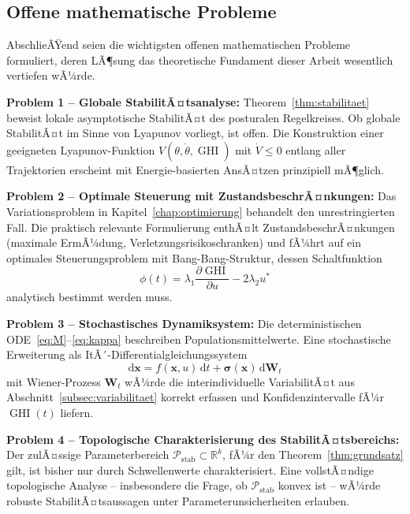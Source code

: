 ﻿\documentclass[12pt,a4paper]{report}
\theoremstyle{plain}
\theoremstyle{definition}
\theoremstyle{remark}
\DeclareMathOperator{\GHI}{GHI}
\begin{document}
	\subsection{Offene mathematische Probleme}
	\label{subsec:mathe}
	
	AbschlieÃŸend seien die wichtigsten offenen mathematischen Probleme
	formuliert, deren LÃ¶sung das theoretische Fundament dieser Arbeit
	wesentlich vertiefen wÃ¼rde.
	
	\textbf{Problem 1 -- Globale StabilitÃ¤tsanalyse:}
	Theorem~\ref{thm:stabilitaet} beweist lokale asymptotische StabilitÃ¤t
	des posturalen Regelkreises. Ob globale StabilitÃ¤t im Sinne von Lyapunov
	vorliegt, ist offen. Die Konstruktion einer geeigneten Lyapunov-Funktion
	$V(\theta, \dot\theta, \GHI)$ mit
	$\dot{V} \leq 0$ entlang aller Trajektorien erscheint mit
	Energie-basierten AnsÃ¤tzen prinzipiell mÃ¶glich.
	
	\textbf{Problem 2 -- Optimale Steuerung mit ZustandsbeschrÃ¤nkungen:}
	Das Variationsproblem in Kapitel~\ref{chap:optimierung} behandelt
	den unrestringierten Fall. Die praktisch relevante Formulierung enthÃ¤lt
	ZustandsbeschrÃ¤nkungen (maximale ErmÃ¼dung, Verletzungsrisikoschranken)
	und fÃ¼hrt auf ein optimales Steuerungsproblem mit
	Bang-Bang-Struktur, dessen Schaltfunktion
	\[
	\phi(t) = \lambda_1 \frac{\partial \GHI}{\partial u} - 2\lambda_2 u^*
	\]
	analytisch bestimmt werden muss.
	
	\textbf{Problem 3 -- Stochastisches Dynamiksystem:}
	Die deterministischen ODE~\eqref{eq:M}--\eqref{eq:kappa} beschreiben
	Populationsmittelwerte. Eine stochastische Erweiterung als
	ItÃ´-Differentialglei\-chungssystem
	\[
	\mathrm{d}\mathbf{x} = f(\mathbf{x}, u)\,\mathrm{d}t
	+ \boldsymbol{\sigma}(\mathbf{x})\,\mathrm{d}\mathbf{W}_t
	\]
	mit Wiener-Prozess $\mathbf{W}_t$ wÃ¼rde die interindividuelle
	VariabilitÃ¤t aus Abschnitt~\ref{subsec:variabilitaet} korrekt erfassen
	und Konfidenzintervalle fÃ¼r $\GHI(t)$ liefern.
	
	\textbf{Problem 4 -- Topologische Charakterisierung des StabilitÃ¤tsbereichs:}
	Der zulÃ¤ssige Parameterbereich $\mathcal{P}_{\mathrm{stab}} \subset \mathbb{R}^k$,
	fÃ¼r den Theorem~\ref{thm:grundsatz} gilt, ist bisher nur durch Schwellenwerte
	charakterisiert. Eine vollstÃ¤ndige topologische Analyse --
	insbesondere die Frage, ob $\mathcal{P}_{\mathrm{stab}}$ konvex ist --
	wÃ¼rde robuste StabilitÃ¤tsaussagen unter Parameterunsicherheiten erlauben.
	
\end{document}
